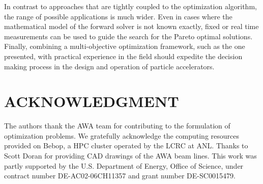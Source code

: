 \documentclass[preprint,linenumbers,amsmath,amssymb,aps,prstab]{revtex4-1}%
\begin{document}
In contrast to approaches that are tightly coupled to the optimization
algorithm, the range of possible applications is much wider.
Even in cases where the mathematical model of the forward solver is not known
exactly, fixed or real time measurements can be used to guide the
search for the Pareto optimal solutions.
Finally, combining a multi-objective optimization framework, such as 
the one presented, with practical experience in the field should expedite 
the decision making process in the design and operation of particle accelerators.

 
\section{ACKNOWLEDGMENT}

The authors thank the AWA team for contributing to the
  formulation of optimization problems. 
  We gratefully acknowledge the computing resources provided on Bebop,
  a HPC cluster operated by the LCRC at ANL.
  Thanks to Scott Doran for providing CAD drawings of the AWA beam lines.
  This work was partly supported by the 
  U.S. Department of Energy, Office of Science, under 
  contract number DE-AC02-06CH11357 and grant number DE-SC0015479. 


\end{document}
